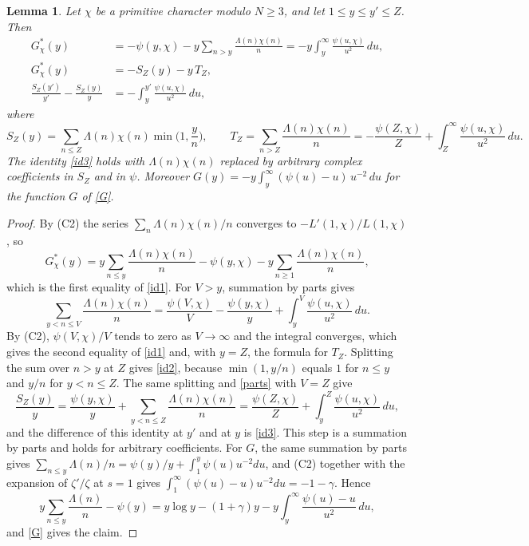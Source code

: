 \documentclass[11pt,letterpaper]{article}
\newtheorem{lemma}[theorem]{Lemma}
\numberwithin{equation}{section}
\begin{document}
\begin{lemma}\label{gchisplit}
Let $\chi$ be a primitive character modulo $N\ge3$, and let $1\le y\le y'\le Z$. Then
\begin{align}
G^\ast_\chi(y)&=-\psi(y,\chi)-y\sum_{n>y}\frac{\Lambda(n)\chi(n)}{n}=-y\int_y^\infty\frac{\psi(u,\chi)}{u^2}\,du,\label{id1}\\
G^\ast_\chi(y)&=-S_Z(y)-y\,T_Z,\label{id2}\\
\frac{S_Z(y')}{y'}-\frac{S_Z(y)}{y}&=-\int_y^{y'}\frac{\psi(u,\chi)}{u^2}\,du,\label{id3}
\end{align}
where
\[
S_Z(y)=\sum_{n\le Z}\Lambda(n)\chi(n)\min\Big(1,\frac yn\Big),\qquad T_Z=\sum_{n>Z}\frac{\Lambda(n)\chi(n)}{n}=-\frac{\psi(Z,\chi)}{Z}+\int_Z^\infty\frac{\psi(u,\chi)}{u^2}\,du .
\]
The identity \eqref{id3} holds with $\Lambda(n)\chi(n)$ replaced by arbitrary complex coefficients in $S_Z$ and in $\psi$. Moreover $G(y)=-y\int_y^\infty(\psi(u)-u)\,u^{-2}\,du$ for the function $G$ of \eqref{G}.
\end{lemma}
\begin{proof}
By (C2) the series $\sum_n\Lambda(n)\chi(n)/n$ converges to $-L'(1,\chi)/L(1,\chi)$, so
\[
G^\ast_\chi(y)=y\sum_{n\le y}\frac{\Lambda(n)\chi(n)}n-\psi(y,\chi)-y\sum_{n\ge1}\frac{\Lambda(n)\chi(n)}n ,
\]
which is the first equality of \eqref{id1}. For $V>y$, summation by parts gives
\begin{equation}\label{parts}
\sum_{y<n\le V}\frac{\Lambda(n)\chi(n)}n=\frac{\psi(V,\chi)}V-\frac{\psi(y,\chi)}y+\int_y^V\frac{\psi(u,\chi)}{u^2}\,du .
\end{equation}
By (C2), $\psi(V,\chi)/V$ tends to zero as $V\to\infty$ and the integral converges, which gives the second equality of \eqref{id1} and, with $y=Z$, the formula for $T_Z$. Splitting the sum over $n>y$ at $Z$ gives \eqref{id2}, because $\min(1,y/n)$ equals $1$ for $n\le y$ and $y/n$ for $y<n\le Z$. The same splitting and \eqref{parts} with $V=Z$ give
\[
\frac{S_Z(y)}y=\frac{\psi(y,\chi)}y+\sum_{y<n\le Z}\frac{\Lambda(n)\chi(n)}n=\frac{\psi(Z,\chi)}Z+\int_y^Z\frac{\psi(u,\chi)}{u^2}\,du ,
\]
and the difference of this identity at $y'$ and at $y$ is \eqref{id3}. This step is a summation by parts and holds for arbitrary coefficients. For $G$, the same summation by parts gives $\sum_{n\le y}\Lambda(n)/n=\psi(y)/y+\int_1^y\psi(u)u^{-2}du$, and (C2) together with the expansion of $\zeta'/\zeta$ at $s=1$ gives $\int_1^\infty(\psi(u)-u)u^{-2}du=-1-\gamma$. Hence
\[
y\sum_{n\le y}\frac{\Lambda(n)}n-\psi(y)=y\log y-(1+\gamma)y-y\int_y^\infty\frac{\psi(u)-u}{u^2}\,du ,
\]
and \eqref{G} gives the claim.
\end{proof}
\end{document}
